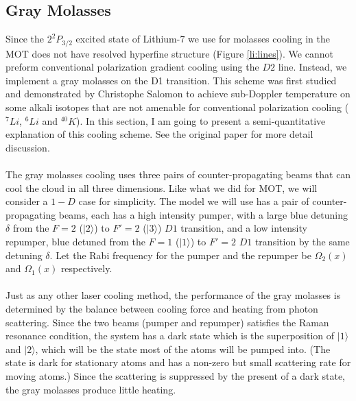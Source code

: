 \subsection{Gray Molasses}\label{theory:gm}

Since the $2^2P_{3/2}$ excited state of Lithium-$7$ we use for molasses cooling in the MOT does not have resolved hyperfine structure (Figure \ref{li:lines}). We cannot preform conventional polarization gradient cooling using the $D2$ line. Instead, we implement a gray molasses on the D1 transition. This scheme was first studied and demonstrated by Christophe Salomon\cite{gm-theory} to achieve sub-Doppler temperature on some alkali isotopes that are not amenable for conventional polarization cooling ($^7Li$, $^6Li$ and $^{40}K$). In this section, I am going to present a semi-quantitative explanation of this cooling scheme. See the original paper\cite{gm-theory} for more detail discussion.\\
\\
The gray molasses cooling uses three pairs of counter-propagating beams that can cool the cloud in all three dimensions. Like what we did for MOT, we will consider a $1-D$ case for simplicity. The model we will use has a pair of counter-propagating beams, each has a high intensity pumper, with a large blue detuning $\delta$ from the $F=2$ ($|2\rangle$) to $F'=2$ ($|3\rangle$) $D1$ transition, and a low intensity repumper, blue detuned from the $F=1$ ($|1\rangle$) to $F'=2$ $D1$ transition by the same detuning $\delta$. Let the Rabi frequency for the pumper and the repumper be $\Omega_2(x)$ and $\Omega_1(x)$ respectively.\\
\\
Just as any other laser cooling method, the performance of the gray molasses is determined by the balance between cooling force and heating from photon scattering. Since the two beams (pumper and repumper) satisfies the Raman resonance condition, the system has a dark state which is the superposition of $|1\rangle$ and $|2\rangle$,
which will be the state most of the atoms will be pumped into. (The state is dark for stationary atoms and has a non-zero but small scattering rate for moving atoms.) Since the scattering is suppressed by the present of a dark state, the gray molasses produce little heating.\\
